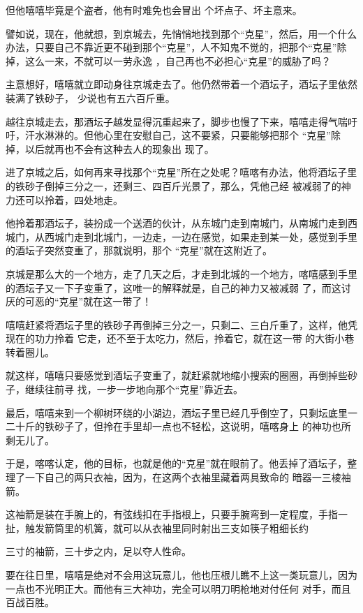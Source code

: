 \documentclass{article}
\begin{document}
但他嘻嘻毕竟是个盗者，他有时难免也会冒出
个坏点子、坏主意来。 

譬如说，现在，他就想，到京城去，先悄悄地找到那个“克星”，然后，用一个什么办法，只要自己不靠近更不碰到那个“克星”，人不知鬼不觉的，把那个“克星”除掉，这么一来，不就可以一劳永逸
，自己再也不必担心“克星”的威胁了吗？ 

主意想好，嘻嘻就立即动身往京城走去了。他仍然带着一个酒坛子，酒坛子里依然装满了铁砂子，
少说也有五六百斤重。 

越往京城走去，那酒坛子越发显得沉重起来了，脚步也慢了下来，嘻嘻走得气喘吁吁，汗水淋淋的。但他心里在安慰自己，这不要紧，只要能够把那个
\newpage
“克星”除掉，以后就再也不会有这种去人的现象出
现了。 

进了京城之后，如何再来寻找那个“克星”所在之处呢？嘻喀有办法，他将酒坛子里的铁砂子倒掉三分之一，还剩三、四百斤光景了，那么，凭他己经
被减弱了的神力还可以拎着，四处地走。 

他拎着那酒坛子，装扮成一个送酒的伙计，从东城门走到南城门，从南城门走到西城门，从西城门走到北城门，一边走，一边在感觉，如果走到某一处，感觉到手里的酒坛子突然变重了，那就说明，那个
“克星”就在这附近了。 

京城是那么大的一个地方，走了几天之后，才走到北城的一个地方，喀嘻感到手里的酒坛子又一下子变重了，这唯一的解释就是，自己的神力又被减弱
了，而这讨厌的可恶的“克星”就在这一带了！ 

嘻嘻赶紧将酒坛子里的铁砂子再倒掉三分之一，只剩二、三白斤重了，这样，他凭现在的功力拎着
\newpage
它走，还不至于太吃力，然后，拎着它，就在这一带
的大街小巷转着圈儿。 

就这样，嘻嘻只要感觉到酒坛子变重了，就赶紧就地缩小搜索的圈圈，再倒掉些砂子，继续往前寻
找，一步一步地向那个“克星”靠近去。 

最后，嘻嘻来到一个柳树环绕的小湖边，酒坛子里已经几乎倒空了，只剩坛底里一二十斤的铁砂子了，但拎在手里却一点也不轻松，这说明，嘻喀身上
的神功也所剩无儿了。 

于是，喀喀认定，他的目标，也就是他的“克星”就在眼前了。他丢掉了酒坛子，整理了一下自己的两只衣袖，因为，在这两个衣袖里藏着两具致命的
暗器一三棱袖箭。 

这袖箭是装在手腕上的，有弦线扣在手指根上，只要手腕弯到一定程度，手指一扯，触发箭筒里的机簧，就可以从衣袖里同时射出三支如筷子粗细长约

\newpage
三寸的袖箭，三十步之内，足以夺人性命。 

要在往日里，嘻嘻是绝对不会用这玩意儿，他也压根儿瞧不上这一类玩意儿，因为一点也不光明正大。而他有三大神功，完全可以明刀明枪地对付任何
对手，而且百战百胜。 
\end{document}
